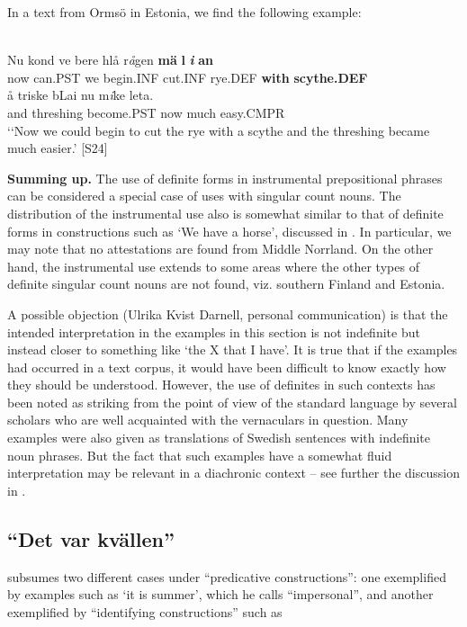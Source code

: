 \z

In a text from Ormsö in Estonia, we find the following example:

\ea \label{} 
\\
\gll Nu  kond  ve  bere  hlå  r\textit{å}gen  \textbf{mä} \textbf{l} \textbf{\textit{i}} \textbf{an}\\
now  can.PST  we  begin.INF  cut.INF  rye.DEF  \textbf{with} \textbf{scythe.DEF}\\
\gll å  triske  bLai  nu  m\textit{i}ke  leta.\\
and  threshing  become.PST  now  much   easy.CMPR\\
\glt ‘‘Now we could begin to cut the rye with a scythe and the threshing became much easier.’ [S24]

\z

\textbf{Summing up.} The use of definite forms in instrumental prepositional phrases can be considered a special case of uses with singular count nouns. The distribution of the instrumental use also is somewhat similar to that of definite forms in constructions such as ‘We have a horse’, discussed in . In particular, we may note that no attestations are found from Middle Norrland. On the other hand, the instrumental use extends to some areas where the other types of definite singular count nouns are not found, viz. southern Finland and Estonia. 

A possible objection (Ulrika Kvist Darnell, personal communication) is that the intended interpretation in the examples in this section is not indefinite but instead closer to something like ‘the X that I have’. It is true that if the examples had occurred in a text corpus, it would have been difficult to know exactly how they should be understood. However, the use of definites in such contexts has been noted as striking from the point of view of the standard language by several scholars who are well acquainted with the vernaculars in question. Many examples were also given as translations of Swedish sentences with indefinite noun phrases. But the fact that such examples have a somewhat fluid interpretation may be relevant in a diachronic context – see further the discussion in . 

\subsection{  “Det var kvällen”}
\label{bkm:Ref224379336}

\citet[16]{Delsing2003a} subsumes two different cases under “predicative constructions”: one exemplified by examples such as  ‘it is summer’, which he calls “impersonal”, and another exemplified by “identifying constructions” such as 

